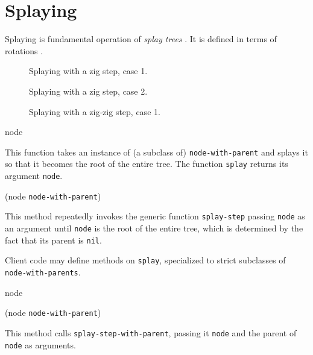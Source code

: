 \section{Splaying}
\label{sec-splaying}

Splaying is fundamental operation of \emph{splay trees}
\cite{Sleator:1985:SBS:3828.3835}.  It is defined in terms of
rotations .

\begin{figure}
\begin{center}
\end{center}
\caption{\label{fig-splay-zig-1}
Splaying with a zig step, case 1.}
\end{figure}

\begin{figure}
\begin{center}
\end{center}
\caption{\label{fig-splay-zig-2}
Splaying with a zig step, case 2.}
\end{figure}

\begin{figure}
\begin{center}
\end{center}
\caption{\label{fig-splay-zig-zig-1}
Splaying with a zig-zig step, case 1.}
\end{figure}

 {node}

This function takes an instance of (a subclass of)
\texttt{node-with-parent} and splays it so that it becomes the root of
the entire tree.  The function \texttt{splay} returns its argument
\texttt{node}.

 {(node \texttt{node-with-parent})}

This method repeatedly invokes the generic function
\texttt{splay-step} passing \texttt{node} as an argument until
\texttt{node} is the root of the entire tree, which is determined by
the fact that its parent is \texttt{nil}.

Client code may define methods on \texttt{splay}, specialized to
strict subclasses of \texttt{node-with-parents}.

 {node}

 {(node \texttt{node-with-parent})}

This method calls \texttt{splay-step-with-parent}, passing it
\texttt{node} and the parent of \texttt{node} as arguments.

